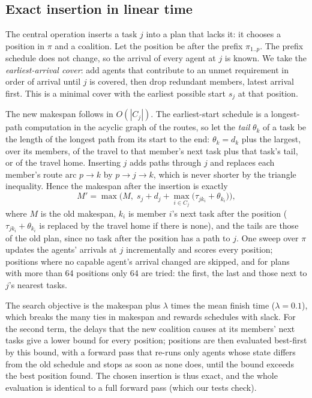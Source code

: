 \subsection{Exact insertion in linear time}
\label{sec:insertion}

The central operation inserts a task $j$ into a plan that lacks it: it chooses a position in $\pi$ and a coalition.
Let the position be after the prefix $\pi_{1..p}$. The prefix schedule does not change, so the arrival of every agent
at $j$ is known. We take the \emph{earliest-arrival cover}: add agents that contribute to an unmet requirement in
order of arrival until $j$ is covered, then drop redundant members, latest arrival first. This is a minimal cover
with the earliest possible start $s_j$ at that position.

The new makespan follows in $O(|C_j|)$. The earliest-start schedule is a longest-path computation in the acyclic graph
of the routes, so let the \emph{tail} $\theta_k$ of a task be the length of the longest path from its start to the
end: $\theta_k = d_k$ plus the largest, over its members, of the travel to that member's next task plus that task's
tail, or of the travel home. Inserting $j$ adds paths through $j$ and replaces each member's route arc $p \to k$ by
$p \to j \to k$, which is never shorter by the triangle inequality. Hence the makespan after the insertion is exactly
\begin{equation}
  M' = \max\Big(M,\; s_j + d_j + \max_{i \in C_j} \big(\tau_{j k_i} + \theta_{k_i}\big)\Big),
  \label{eq:insert}
\end{equation}
where $M$ is the old makespan, $k_i$ is member $i$'s next task after the position ($\tau_{jk_i} + \theta_{k_i}$ is
replaced by the travel home if there is none), and the tails are those of the old plan, since no task after the
position has a path to $j$. One sweep over $\pi$ updates the agents' arrivals at $j$ incrementally and scores every
position; positions where no capable agent's arrival changed are skipped, and for plans with more than 64 positions
only 64 are tried: the first, the last and those next to $j$'s nearest tasks.

The search objective is the makespan plus $\lambda$ times the mean finish time ($\lambda = 0.1$), which breaks the
many ties in makespan and rewards schedules with slack. For the second term, the delays that the new coalition causes
at its members' next tasks give a lower bound for every position; positions are then evaluated best-first by this
bound, with a forward pass that re-runs only agents whose state differs from the old schedule and stops as soon as
none does, until the bound exceeds the best position found. The chosen insertion is thus exact, and the whole
evaluation is identical to a full forward pass (which our tests check).

